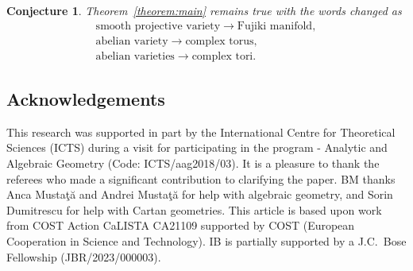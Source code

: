 \documentclass[10pt,a4paper]{amsart}
\numberwithin{equation}{section}
\newtheorem{Conjecture}[Theorem]{Conjecture}
 { \theoremstyle{definition}
\newtheorem{Definition}[Theorem]{Definition}
\newtheorem{Note}[Theorem]{Note}
\newtheorem{Example}[Theorem]{Example}
\newtheorem{Remark}[Theorem]{Remark} }
\begin{document}
\begin{Conjecture}
Theorem~{\rm \ref{theorem:main}} remains true with the words changed as
\begin{gather*}
\text{smooth projective variety}\to\text{Fujiki manifold},\\
\text{abelian variety}\to\text{complex torus},\\
\text{abelian varieties}\to\text{complex tori}.
\end{gather*}
\end{Conjecture}

\subsection*{Acknowledgements}

This research was supported in part by the International Centre for Theoretical Sciences (ICTS) during a visit for participating in the program - Analytic and Algebraic Geometry (Code: ICTS/aag2018/03).
It is a pleasure to thank the referees who made a significant contribution to clarifying the paper.
BM thanks Anca Musta\c{t}\u{a} and Andrei Musta\c{t}\u{a} for help with algebraic geometry, and Sorin Dumitrescu for help with Cartan geometries.
This article is based upon work from COST Action CaLISTA CA21109 supported by COST (European Cooperation in Science and Technology).
IB is partially supported by a J.C.~Bose Fellowship (JBR/2023/000003).

%
%

\providecommand{\MR}{\relax\ifhmode\unskip\space\fi MR }
\providecommand{\MRhref}[2]{%
 \href{http://www.ams.org/mathscinet-getitem?mr=#1}{#2}
}
\providecommand{\href}[2]{#2}

\end{document}
